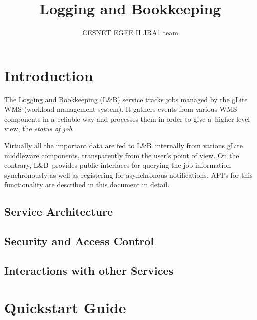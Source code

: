 \documentclass{egee}
\title{Logging and Bookkeeping}
\author{CESNET EGEE II JRA1 team}
\def\LB{L\&B}
\begin{document}

\newpage
\tableofcontents
\newpage

\section{Introduction}

The Logging and Bookkeeping (\LB) service tracks jobs managed by 
the gLite WMS (workload management system).
It gathers events from various WMS components in a~reliable way
and processes them in order to give a~higher level view, the
\emph{status of job}.

Virtually all the important
data are fed to \LB\ internally from various gLite middleware
components, transparently from the user's point of view.
On the contrary, \LB\ provides public interfaces for querying the job
information synchronously as well as registering for asynchronous
notifications.
API's for this functionality are described in this document in detail.


\subsection{Service Architecture}



\subsection{Security and Access Control}



\subsection{Interactions with other Services}



\newpage
\section{Quickstart Guide}
\end{document}
